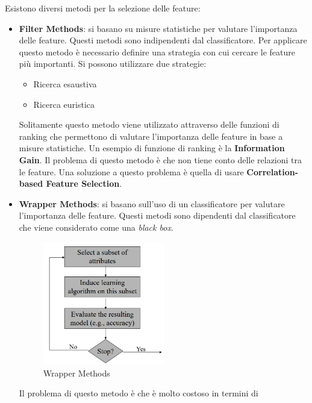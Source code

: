 Esistono diversi metodi per la selezione delle feature:
\begin{itemize}
      \item \textbf{Filter Methods}: si basano su misure statistiche per valutare
            l'importanza delle feature. Questi metodi sono indipendenti dal
            classificatore. Per applicare questo metodo è necessario definire 
            una strategia con cui cercare le feature più importanti. Si possono
            utilizzare due strategie:
            \begin{itemize}
                  \item Ricerca esaustiva
                  \item Ricerca euristica
            \end{itemize}
            Solitamente questo metodo viene utilizzato attraverso delle funzioni 
            di ranking che permettono di valutare l'importanza delle feature in 
            base a misure statistiche. Un esempio di funzione di ranking è la
            \textbf{Information Gain}.
            Il problema di questo metodo è che non tiene conto delle relazioni tra
            le feature. Una soluzione a questo problema è quella di usare 
            \textbf{Correlation-based Feature Selection}.
      \item \textbf{Wrapper Methods}: si basano sull'uso di un classificatore per
            valutare l'importanza delle feature. Questi metodi sono dipendenti dal
            classificatore che viene considerato come una \textit{black box}.
            \begin{figure}[!ht]
                  \centering
                  \includegraphics[width=0.5\textwidth]{./img/Preprocessing/wrapper.png}
                  \caption{Wrapper Methods}
                  \label{fig:wrapper}
            \end{figure}
            Il problema di questo metodo è che è molto costoso in termini di

\end{itemize}
